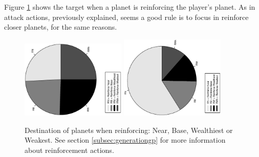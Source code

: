 \documentclass[conference]{IEEEtran}
\begin{document}
Figure \ref{figura:tarta_reinforcing} shows the target when a planet is reinforcing the player's planet. As in attack actions, previously explained, seems a good rule is to focus in reinforce closer planets, for the same reasons.
\begin{figure}[htb]
\tiny
\begin{center}

    \includegraphics[trim=1cm 7cm 1cm 7cm, clip=true,width=5cm,angle=-90]{./imags/distribution_initial_reinforce.eps}
    \includegraphics[trim=1cm 7cm 1cm 7cm, clip=true,width=5cm,angle=-90]{./imags/distribution_final_reinforce.eps}

\end{center}
\caption{Destination of planets when reinforcing: Near, Base, Wealthiest or Weakest. See section \ref{subsec:generationgp} for more information about reinforcement actions.}
\label{figura:tarta_reinforcing}
\end{figure}
\end{document}
